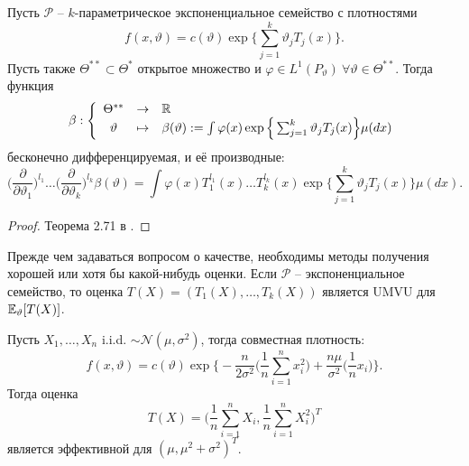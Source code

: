 \begin{thm} \label{thm2.38}
	Пусть $\mathcal{P}$ -- $k$-параметрическое экспоненциальное семейство с плотностями
	\[f(x, \vartheta) = c(\vartheta) \exp \Big \{ \sum_{j = 1}^k \vartheta_j T_j(x) \Big \}.   \]
	Пусть также $\Theta^{**} \subset \Theta^{*}$ открытое множество и $\varphi \in L^1(P_\vartheta) \ \forall \vartheta \in \Theta^{**}$. Тогда функция
	\[ \beta :
	\left \{
	\begin{array}{ccl}
	\Theta^{**} & \rightarrow & \mathbb{R} \\
	\vartheta & \mapsto & \beta(\vartheta) := \int \varphi(x) \exp \Big \{ \sum_{j = 1}^k \vartheta_j T_j(x) \Big\} \mu(dx)
	\end{array}
	\right.
	\]
	бесконечно дифференцируемая, и её производные:
	\[ \Big(\frac{\partial}{\partial \vartheta_1}\Big)^{l_1} \dots \Big(\frac{\partial}{\partial \vartheta_k}\Big)^{l_k} \beta(\vartheta) = \int \varphi(x) T_1^{l_1}(x) \dots T_k^{l_k}(x) \exp \Big \{ \sum_{j = 1}^k \vartheta_j T_j(x) \Big\} \mu(dx). \]
\end{thm}
\begin{proof}
	Теорема 2.71 в \cite{LehmannRomano}.
\end{proof}

\begin{rmrk}
	Прежде чем задаваться вопросом о качестве, необходимы методы получения хорошей или хотя бы какой-нибудь оценки.
	Если $\mathcal{P}$ -- экспоненциальное семейство, то оценка $T(X)=(T_1(X), \dots, T_k(X))$ является UMVU для $\mathbb{E}_\vartheta[T(X)]$.
\end{rmrk}

\begin{exmp}
	Пусть $X_1, \dots, X_n$ i.i.d. $\sim \mathcal{N}(\mu, \sigma^2)$, тогда совместная плотность:
	\[ f(x, \vartheta) = c(\vartheta) \exp \Big\{ -\frac{n}{2\sigma^2}\Big( \frac{1}{n} \sum_{i=1}^n x_i^2 \Big) + \frac{n\mu}{\sigma^2}\Big( \frac{1}{n}x_i \Big) \Big\}. \]
	Тогда оценка
	\[ T(X)=\Big(\frac{1}{n}\sum_{i=1}^{n}X_i, \frac{1}{n}\sum_{i=1}^{n}X_i^2\Big)^T \]
	является эффективной для $(\mu, \mu^2+\sigma^2)^T$.
\end{exmp}

